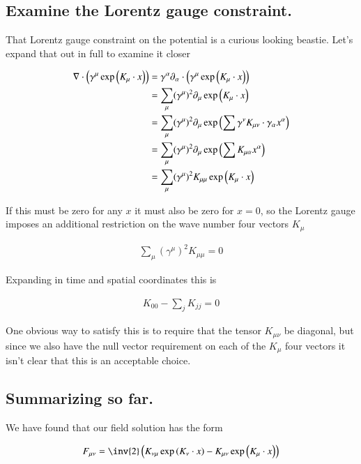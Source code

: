 \documentclass{article}
\begin{document}
\subsection{ Examine the Lorentz gauge constraint. }

That Lorentz gauge constraint on the potential is a curious looking beastie.  Let's expand that out in full to examine it closer

\begin{align*}
\nabla \cdot \left(\gamma^\mu \exp\left( K_\mu \cdot x \right)\right) 
&= \gamma^\alpha \partial_\alpha \cdot \left(\gamma^\mu \exp\left( K_\mu \cdot x \right)\right)  \\
&= \sum_\mu (\gamma^\mu)^2 \partial_\mu \exp\left( K_\mu \cdot x \right) \\
&= \sum_\mu (\gamma^\mu)^2 \partial_\mu \exp\left( \sum \gamma^\nu K_{\mu\nu} \cdot \gamma_\alpha x^\alpha \right) \\
&= \sum_\mu (\gamma^\mu)^2 \partial_\mu \exp\left( \sum K_{\mu\alpha} x^\alpha \right) \\
&= \sum_\mu (\gamma^\mu)^2 K_{\mu\mu} \exp\left( K_\mu \cdot x \right)
\end{align*}

If this must be zero for any $x$ it must also be zero for $x =0$, so the Lorentz gauge imposes an additional restriction on the
wave number four vectors $K_\mu$

\begin{align*}
\sum_\mu (\gamma^\mu)^2 K_{\mu\mu} = 0 
\end{align*}

Expanding in time and spatial coordinates this is

\begin{align*}
K_{00} - \sum_j K_{jj} = 0 
\end{align*}

One obvious way to satisfy this is to require that the tensor $K_{\mu\nu}$ be diagonal, but since we also have the null vector requirement
on each of the $K_\mu$ four vectors it isn't clear that this is an acceptable choice.

\subsection{ Summarizing so far. }

We have found that our field solution has the form

\begin{align*}
F_{\mu\nu} &= \inv{2} \left( K_{\nu\mu} \exp\left( K_{\nu} \cdot x \right) - K_{\mu\nu} \exp\left( K_{\mu} \cdot x \right) \right) \\
\end{align*}
\end{document}
